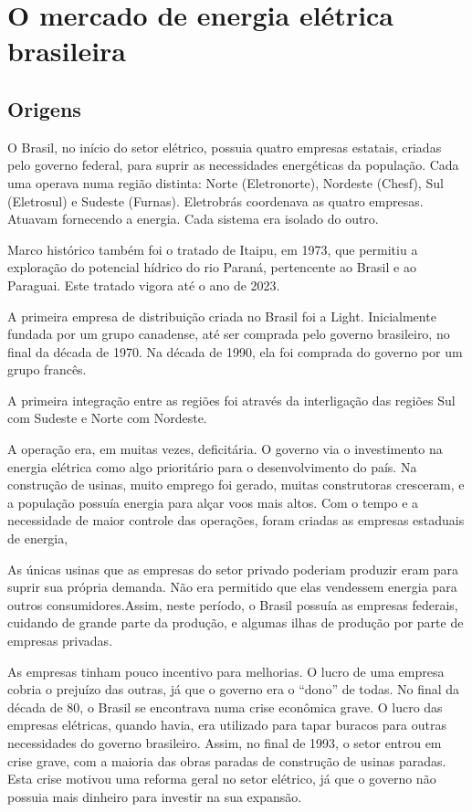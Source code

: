 \section{O mercado de energia elétrica brasileira}


\subsection{Origens}

O Brasil, no início do setor elétrico, possuia quatro empresas estatais,
criadas pelo governo federal, para suprir as necessidades energéticas
da população. Cada uma operava numa região distinta: Norte (Eletronorte),
Nordeste (Chesf), Sul (Eletrosul) e Sudeste (Furnas). Eletrobrás coordenava
as quatro empresas. Atuavam fornecendo a energia. Cada sistema era
isolado do outro.

Marco histórico também foi o tratado de Itaipu, em 1973, que permitiu
a exploração do potencial hídrico do rio Paraná, pertencente ao Brasil
e ao Paraguai. Este tratado vigora até o ano de 2023.

A primeira empresa de distribuição criada no Brasil foi a Light. Inicialmente
fundada por um grupo canadense, até ser comprada pelo governo brasileiro,
no final da década de 1970. Na década de 1990, ela foi comprada do
governo por um grupo francês.

A primeira integração entre as regiões foi através da interligação
das regiões Sul com Sudeste e Norte com Nordeste. 

A operação era, em muitas vezes, deficitária. O governo via o investimento
na energia elétrica como algo prioritário para o desenvolvimento do
país. Na construção de usinas, muito emprego foi gerado, muitas construtoras
cresceram, e a população possuía energia para alçar voos mais altos.
Com o tempo e a necessidade de maior controle das operações, foram
criadas as empresas estaduais de energia, 

As únicas usinas que as empresas do setor privado poderiam produzir
eram para suprir sua própria demanda. Não era permitido que elas vendessem
energia para outros consumidores.Assim, neste período, o Brasil possuía
as empresas federais, cuidando de grande parte da produção, e algumas
ilhas de produção por parte de empresas privadas. 

As empresas tinham pouco incentivo para melhorias. O lucro de uma
empresa cobria o prejuízo das outras, já que o governo era o ``dono''
de todas. No final da década de 80, o Brasil se encontrava numa crise
econômica grave. O lucro das empresas elétricas, quando havia, era
utilizado para tapar buracos para outras necessidades do governo brasileiro.
Assim, no final de 1993, o setor entrou em crise grave, com a maioria
das obras paradas de construção de usinas paradas. Esta crise motivou
uma reforma geral no setor elétrico, já que o governo não possuia
mais dinheiro para investir na sua expansão.

